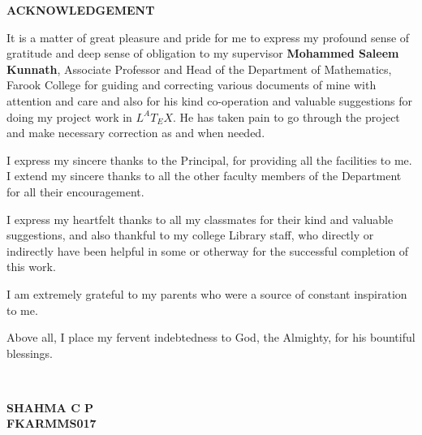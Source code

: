 \thispagestyle{empty}


{\begin{center}{\bf {\Large {ACKNOWLEDGEMENT}}}\end{center}}

{\itshape{

It is a matter of great  pleasure and pride for me to  express my profound sense of gratitude and deep sense of obligation to my supervisor  \textbf{Mohammed Saleem Kunnath}, Associate Professor and Head of the Department of Mathematics, Farook College for guiding and correcting various documents of mine with attention and care and also for his kind co-operation and valuable suggestions for doing my project work in $L^AT_EX$. He has taken pain to go through the project and make necessary correction as and when needed.

I express my sincere thanks to  the Principal, for providing all the facilities to me. I extend my sincere thanks to all the other faculty members of  the Department for all their encouragement. 

I express my heartfelt thanks to all my classmates for their kind and valuable suggestions, and also thankful to my college Library staff, who directly or indirectly have been helpful in some or otherway for the successful completion of this work.

I am extremely grateful to my parents who were a source of constant inspiration to me.

Above all, I place my fervent indebtedness to God, the Almighty, for his bountiful blessings.}}\\

\begin{flushright}

\textbf{SHAHMA C P}\\
\textbf{FKARMMS017}\\
\end{flushright}



